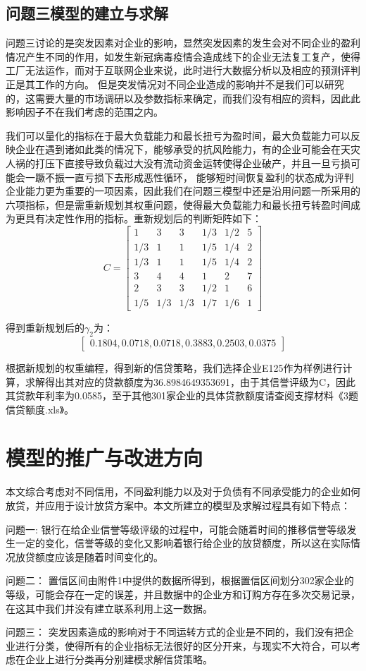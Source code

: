\documentclass[dvipsnames,withoutpreface,bwprint]{cumcmthesis}
\begin{document}
\subsection{问题三模型的建立与求解}
问题三讨论的是突发因素对企业的影响，显然突发因素的发生会对不同企业的盈利情况产生不同的作用，如发生新冠病毒疫情会造成线下的企业无法复工复产，使得工厂无法运作，而对于互联网企业来说，此时进行大数据分析以及相应的预测评判正是其工作的方向。
但是突发情况对不同企业造成的影响并不是我们可以研究的，这需要大量的市场调研以及参数指标来确定，而我们没有相应的资料，因此此影响因子不在我们考虑的范围之内。
\par 我们可以量化的指标在于最大负载能力和最长扭亏为盈时间，最大负载能力可以反映企业在遇到诸如此类的情况下，能够承受的抗风险能力，有的企业可能会在天灾人祸的打压下直接导致负载过大没有流动资金运转使得企业破产，并且一旦亏损可能会一蹶不振一直亏损下去形成恶性循环，
能够短时间恢复盈利的状态成为评判企业能力更为重要的一项因素，因此我们在问题三模型中还是沿用问题一所采用的六项指标，但是需重新规划其权重问题，使得最大负载能力和最长扭亏转盈时间成为更具有决定性作用的指标。重新规划后的判断矩阵如下：
\[C=\begin{bmatrix}
    1 &3 &3 &1/3 &1/2 &5 \\
    1/3 &1 &1 &1/5 &1/4 &2 \\
    1/3 &1 &1 &1/5 &1/4 &2 \\
    3 &4 &4 &1 &2 &7 \\
    2 &3 &3 &1/2 &1 &6 \\
    1/5 &1/3 &1/3 &1/7 &1/6 &1
\end{bmatrix}\]
\par 得到重新规划后的$\gamma_2$为：
\[\begin{bmatrix}
    0.1804    ,0.0718    ,0.0718    ,0.3883    ,0.2503    ,0.0375
\end{bmatrix}\]
\par 根据新规划的权重编程，得到新的信贷策略，我们选择企业E125作为样例进行计算，求解得出其对应的贷款额度为36.8984649353691，由于其信誉评级为C，因此其贷款年利率为0.0585，至于其他301家企业的具体贷款额度请查阅支撑材料《3题信贷额度.xls》。
\section{模型的推广与改进方向}
本文综合考虑对不同信用，不同盈利能力以及对于负债有不同承受能力的企业如何放贷，并应用于设计放贷方案中。本文所建立的模型及求解过程具有如下特点：
\par 问题一:
银行在给企业信誉等级评级的过程中，可能会随着时间的推移信誉等级发生一定的变化，信誉等级的变化又影响着银行给企业的放贷额度，所以这在实际情况放贷额度应该是随着时间变化的。
\par 问题二：
置信区间由附件1中提供的数据所得到，根据置信区间划分302家企业的等级，可能会存在一定的误差，并且数据中的企业方和订购方存在多次交易记录，在这其中我们并没有建立联系利用上这一数据。
\par 问题三：
突发因素造成的影响对于不同运转方式的企业是不同的，我们没有把企业进行分类，使得所有的企业指标无法很好的区分开来，与现实不大符合，可以考虑在企业上进行分类再分别建模求解信贷策略。
\end{document}
